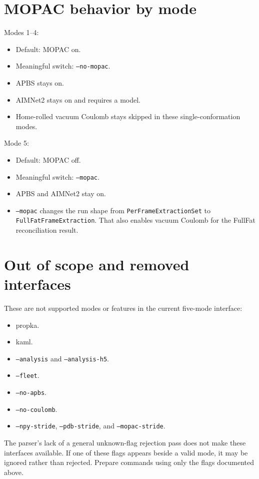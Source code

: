 \documentclass[11pt]{article}
\begin{document}
\section{MOPAC behavior by mode}

Modes 1--4:

\begin{itemize}
\item Default: MOPAC on.
\item Meaningful switch: \texttt{--no-mopac}.
\item APBS stays on.
\item AIMNet2 stays on and requires a model.
\item Home-rolled vacuum Coulomb stays skipped in these single-conformation
  modes.
\end{itemize}

Mode 5:

\begin{itemize}
\item Default: MOPAC off.
\item Meaningful switch: \texttt{--mopac}.
\item APBS and AIMNet2 stay on.
\item \texttt{--mopac} changes the run shape from
  \texttt{PerFrameExtractionSet} to \texttt{FullFatFrameExtraction}. That also
  enables vacuum Coulomb for the FullFat reconciliation result.
\end{itemize}

\section{Out of scope and removed interfaces}

These are not supported modes or features in the current five-mode interface:

\begin{itemize}
\item propka.
\item kaml.
\item \texttt{--analysis} and \texttt{--analysis-h5}.
\item \texttt{--fleet}.
\item \texttt{--no-apbs}.
\item \texttt{--no-coulomb}.
\item \texttt{--npy-stride}, \texttt{--pdb-stride}, and
  \texttt{--mopac-stride}.
\end{itemize}

The parser's lack of a general unknown-flag rejection pass does not make these
interfaces available. If one of these flags appears beside a valid mode, it may
be ignored rather than rejected. Prepare commands using only the flags
documented above.
\end{document}
